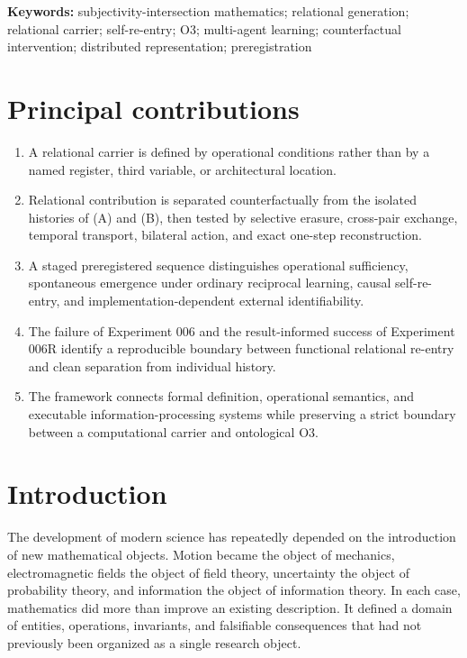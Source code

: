 \documentclass[11pt,a4paper]{article}
\begin{document}
\noindent\textbf{Keywords:} subjectivity-intersection mathematics; relational generation; relational carrier; self-re-entry; O3; multi-agent learning; counterfactual intervention; distributed representation; preregistration

\section*{Principal contributions}
\begin{enumerate}
  \item A relational carrier is defined by operational conditions rather than by a named register, third variable, or architectural location.
  \item Relational contribution is separated counterfactually from the isolated histories of (A) and (B), then tested by selective erasure, cross-pair exchange, temporal transport, bilateral action, and exact one-step reconstruction.
  \item A staged preregistered sequence distinguishes operational sufficiency, spontaneous emergence under ordinary reciprocal learning, causal self-re-entry, and implementation-dependent external identifiability.
  \item The failure of Experiment 006 and the result-informed success of Experiment 006R identify a reproducible boundary between functional relational re-entry and clean separation from individual history.
  \item The framework connects formal definition, operational semantics, and executable information-processing systems while preserving a strict boundary between a computational carrier and ontological O3.
\end{enumerate}

\clearpage
\tableofcontents
\clearpage

\section{Introduction}

The development of modern science has repeatedly depended on the introduction of new mathematical objects. Motion became the object of mechanics, electromagnetic fields the object of field theory, uncertainty the object of probability theory, and information the object of information theory. In each case, mathematics did more than improve an existing description. It defined a domain of entities, operations, invariants, and falsifiable consequences that had not previously been organized as a single research object.
\end{document}
